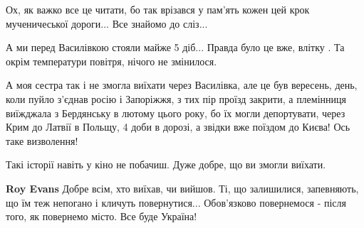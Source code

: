  
 
 
 
 

\qqSecCmt


Ох, як важко все це читати, бо так врізався у пам'ять кожен цей крок
мученичеської дороги... Все знайомо до сліз...


А ми перед Василівкою стояли майже 5 діб... Правда було це вже, влітку . Та
окрім температури повітря, нічого не змінилося.


А моя сестра так і не змогла виїхати через Василівка, але це був вересень,
день, коли пуйло з'єднав росію і Запоріжжя, з тих пір проїзд закрити, а
племінниця виїжджала з Бердянську в лютому цього року, бо їх могли депортувати,
через Крим до Латвії в Польщу, 4 доби в дорозі, а звідки вже поїздом до Києва!
Ось таке визволення!


Такі історії навіть у кіно не побачиш. Дуже добре, що ви змогли виїхати.

\begin{itemize} %
\textbf{Roy Evans} Добре всім, хто виїхав, чи вийшов.
Ті, що залишилися, запевняють, що їм теж непогано і кличуть повернутися...
Обов'язково повернемося - після того, як повернемо місто.
Все буде Україна!
\end{itemize} %
